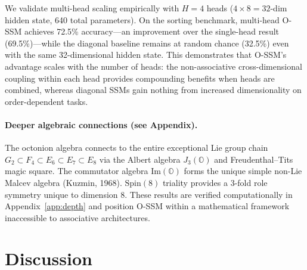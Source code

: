 \documentclass{article}
\newcommand{\Oct}{\mathbb{O}}
\begin{document}
We validate multi-head scaling empirically with $H = 4$ heads ($4 \times 8 = 32$-dim hidden state, 640 total parameters).
On the sorting benchmark, multi-head O-SSM achieves 72.5\% accuracy---an improvement over the single-head result (69.5\%)---while the diagonal baseline remains at random chance (32.5\%) even with the same 32-dimensional hidden state.
This demonstrates that O-SSM's advantage scales with the number of heads: the non-associative cross-dimensional coupling within each head provides compounding benefits when heads are combined, whereas diagonal SSMs gain nothing from increased dimensionality on order-dependent tasks.


\paragraph{Deeper algebraic connections (see Appendix).}
The octonion algebra connects to the entire exceptional Lie group chain $G_2 \subset F_4 \subset E_6 \subset E_7 \subset E_8$ via the Albert algebra $J_3(\Oct)$ and Freudenthal--Tits magic square.
The commutator algebra $\mathrm{Im}(\Oct)$ forms the unique simple non-Lie Malcev algebra (Kuzmin, 1968).
$\mathrm{Spin}(8)$ triality provides a 3-fold role symmetry unique to dimension 8.
These results are verified computationally in Appendix~\ref{app:depth} and position O-SSM within a mathematical framework inaccessible to associative architectures.



\section{Discussion}
\label{sec:discussion}
\end{document}
